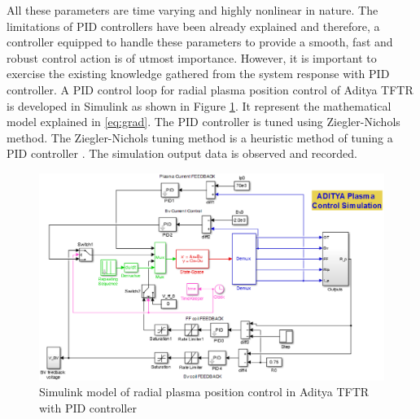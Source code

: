 All these parameters are time varying and highly nonlinear in nature. The limitations of PID controllers have been already explained and therefore, a controller equipped to handle these parameters to provide a smooth, fast and robust control action is of utmost importance. However, it is important to exercise the existing knowledge gathered from the system response with PID controller. A PID control loop for radial plasma position control of Aditya TFTR is developed in Simulink as shown in Figure \ref{fig:Fig5_4}. It represent the mathematical model explained in \eqref{eq:grad}. The PID controller is tuned using Ziegler\hyp{}Nichols method. The Ziegler\hyp{}Nichols tuning method is a heuristic method of tuning a PID controller \cite{bandyopadhyaya2004,bandyopadhyaya2006}. The simulation output data is observed and recorded. 
\begin{figure}[h!]
\centering
\includegraphics[width=1\linewidth]{Chapter5/chapter5/Fig5_AdityaSimPID}
\caption{Simulink model of radial plasma position control in Aditya TFTR with PID controller}
\label{fig:Fig5_4}
\end{figure}

